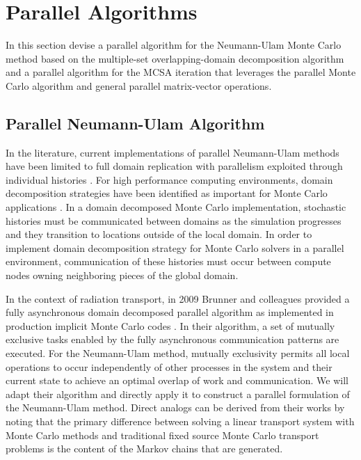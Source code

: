 \documentclass{snamc2013}
\begin{document}
\section{Parallel Algorithms}
In this section devise a parallel algorithm for the Neumann-Ulam Monte
Carlo method based on the multiple-set overlapping-domain
decomposition algorithm and a parallel algorithm for the MCSA
iteration that leverages the parallel Monte Carlo algorithm and
general parallel matrix-vector operations.

\subsection{Parallel Neumann-Ulam Algorithm}
In the literature, current implementations of parallel Neumann-Ulam
methods have been limited to full domain replication with parallelism
exploited through individual histories
\cite{alexandrov_efficient_1998}. For high performance computing
environments, domain decomposition strategies have been identified as
important for Monte Carlo applications
\cite{brunner_comparison_2006,siegel_analysis_2012}. In a domain
decomposed Monte Carlo implementation, stochastic histories must be
communicated between domains as the simulation progresses and they
transition to locations outside of the local domain. In order to
implement domain decomposition strategy for Monte Carlo solvers in a
parallel environment, communication of these histories must occur
between compute nodes owning neighboring pieces of the global domain.

In the context of radiation transport, in 2009 Brunner and colleagues
provided a fully asynchronous domain decomposed parallel algorithm as
implemented in production implicit Monte Carlo codes
\cite{brunner_efficient_2009}. In their algorithm, a set of mutually
exclusive tasks enabled by the fully asynchronous communication
patterns are executed. For the Neumann-Ulam method, mutually
exclusivity permits all local operations to occur independently of
other processes in the system and their current state to achieve an
optimal overlap of work and communication. We will adapt their
algorithm and directly apply it to construct a parallel formulation of
the Neumann-Ulam method. Direct analogs can be derived from their
works by noting that the primary difference between solving a linear
transport system with Monte Carlo methods and traditional fixed source
Monte Carlo transport problems is the content of the Markov chains
that are generated.
\end{document}
